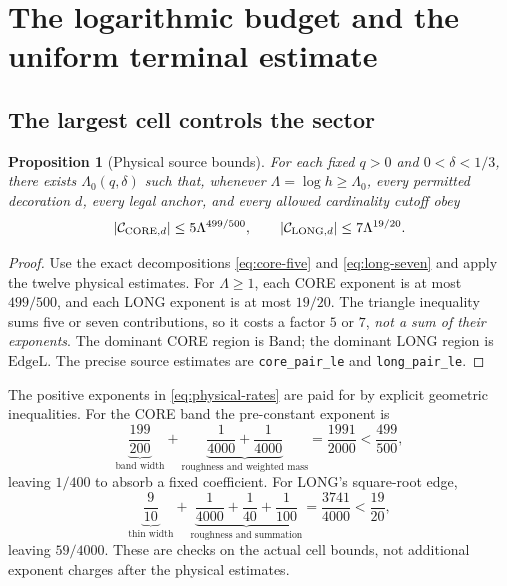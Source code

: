\documentclass[11pt]{article}
\newtheorem{proposition}[theorem]{Proposition}
\theoremstyle{definition}
\theoremstyle{remark}
\newcommand{\1}{\mathbf 1}
\begin{document}
\section{The logarithmic budget and the uniform terminal estimate}
\label{sec:aggregation}

\subsection{The largest cell controls the sector}

\begin{proposition}[Physical source bounds]\label{prop:physical-rates}
For each fixed $q>0$ and $0<\delta<1/3$, there exists
$\Lambda_0(q,\delta)$ such that, whenever
$\Lambda=\log h\ge\Lambda_0$, every permitted decoration $d$,
every legal anchor, and every allowed cardinality cutoff obey
\begin{equation}\label{eq:physical-rates}
 |\mathcal C_{{\rm CORE},d}|\le5\Lambda^{499/500},\qquad
 |\mathcal C_{{\rm LONG},d}|\le7\Lambda^{19/20}.
\end{equation}
\end{proposition}
\begin{proof}
Use the exact decompositions \eqref{eq:core-five} and
\eqref{eq:long-seven} and apply the twelve physical estimates.
For $\Lambda\ge1$, each CORE exponent is at most $499/500$,
and each LONG exponent is at most $19/20$.
The triangle inequality sums five or seven contributions, so it
costs a factor $5$ or $7$, \emph{not a sum of their exponents}.
The dominant CORE region is $\mathrm{Band}$; the dominant LONG
region is $\mathrm{EdgeL}$. The precise source estimates are
\texttt{core\_pair\_le} and \texttt{long\_pair\_le}.
\end{proof}

The positive exponents in \eqref{eq:physical-rates} are paid for
by explicit geometric inequalities. For the CORE band the
pre-constant exponent is
\begin{equation}\label{eq:band-accounting}
 \underbrace{\frac{199}{200}}_{\text{band width}}
 +\underbrace{\frac1{4000}+\frac1{4000}}_{\text{roughness and weighted mass}}
 =\frac{1991}{2000}
 <\frac{499}{500},
\end{equation}
leaving $1/400$ to absorb a fixed coefficient. For LONG's
square-root edge,
\begin{equation}\label{eq:edge-accounting}
 \underbrace{\frac9{10}}_{\text{thin width}}
 +\underbrace{\frac1{4000}+\frac1{40}+\frac1{100}}_{\text{roughness and summation}}
 =\frac{3741}{4000}<\frac{19}{20},
\end{equation}
leaving $59/4000$. These are checks on the actual cell bounds,
not additional exponent charges after the physical estimates.
\end{document}
